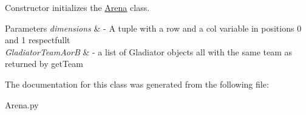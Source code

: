 Constructor initializes the \hyperlink{classArena_1_1Arena}{Arena} class. 


\begin{DoxyParams}{Parameters}
{\em dimensions} & -\/ A tuple with a row and a col variable in positions 0 and 1 respectfullt \\
\hline
{\em Gladiator\+Team\+Aor\+B} & -\/ a list of Gladiator objects all with the same team as returned by get\+Team \\
\hline
\end{DoxyParams}


The documentation for this class was generated from the following file\+:\begin{DoxyCompactItemize}
\item 
Arena.\+py\end{DoxyCompactItemize}
